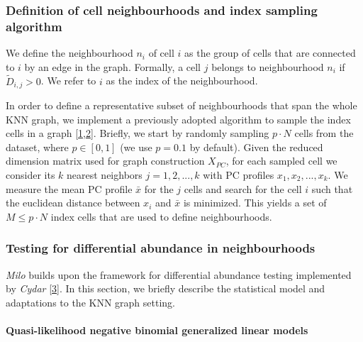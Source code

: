 \documentclass[
]{article}
\begin{document}
\hypertarget{definition-of-cell-neighbourhoods-and-index-sampling-algorithm}{%
\subsubsection{Definition of cell neighbourhoods and index sampling algorithm}\label{definition-of-cell-neighbourhoods-and-index-sampling-algorithm}}

We define the neighbourhood \(n_i\) of cell \(i\) as the group of cells that are connected to \(i\) by an edge in the graph.
Formally, a cell \(j\) belongs to neighbourhood \(n_i\) if \(\tilde{D}_{i,j} > 0\). We refer to \(i\) as the index of the neighbourhood.

In order to define a representative subset of neighbourhoods that span the whole KNN graph, we implement a previously adopted algorithm to sample the index cells in a graph {[}\protect\hyperlink{ref-gutTrajectoriesCellcycleProgression2015}{1},\protect\hyperlink{ref-settyWishboneIdentifiesBifurcating2016}{2}{]}.
Briefly, we start by randomly sampling \(p \cdot N\) cells from the dataset, where \(p \in [0,1]\) (we use \(p = 0.1\) by default).
Given the reduced dimension matrix used for graph construction \(X_{PC}\), for each sampled cell we consider its \(k\) nearest neighbors \(j = 1,2,...,k\) with PC profiles \({x_1, x_2, ... , x_k}\). We measure the mean PC profile \(\bar{x}\) for the \(j\) cells and search for the cell \(i\) such that the euclidean distance between \(x_i\) and \(\bar{x}\) is minimized. This yields a set of \(M \leq p \cdot N\) index cells that are used to define neighbourhoods.

\hypertarget{testing-for-differential-abundance-in-neighbourhoods}{%
\subsubsection{Testing for differential abundance in neighbourhoods}\label{testing-for-differential-abundance-in-neighbourhoods}}

\emph{Milo} builds upon the framework for differential abundance testing implemented by \emph{Cydar} {[}\protect\hyperlink{ref-lunTestingDifferentialAbundance2017}{3}{]}. In this section, we briefly describe the statistical model and adaptations to the KNN graph setting.

\hypertarget{quasi-likelihood-negative-binomial-generalized-linear-models}{%
\paragraph*{Quasi-likelihood negative binomial generalized linear models}\label{quasi-likelihood-negative-binomial-generalized-linear-models}}
\end{document}
